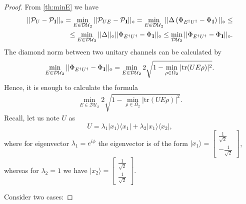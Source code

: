 \documentclass[preprint,12pt, a4paper]{elsarticle}
\newcommand{\ket}[1]{\ensuremath{|#1\rangle}}
\newcommand{\bra}[1]{\ensuremath{\langle#1|}}
\newcommand{\ketbra}[2]{\ensuremath{\ket{#1}\bra{#2}}}
\newcommand{\1}{{\rm 1\hspace{-0.9mm}l}}
\newcommand{\diaguni}{\ensuremath{\mathcal{DU}}}
\newcommand{\tr}{\mathrm{tr}}
\begin{document}
\begin{proof} From \ref{th:minE} we have 
	\begin{equation}
	\begin{split}
	||\mathcal{P}_U - \mathcal{P}_{\1}||_\diamond =\min_{E \in \diaguni_2} 
	||\mathcal{P}_{UE} - \mathcal{P}_{\1}||_\diamond = \min_{E \in 
	\diaguni_2}|| \Delta \left(\Phi_{E^\dagger U^\dagger} - \Phi_{\1} \right) 
	||_\diamond \le \\ \le \min_{E \in \diaguni_2} ||\Delta||_\diamond || 
	\Phi_{E^\dagger U^\dagger} - \Phi_{\1}  ||_\diamond \le \min_{\diaguni_2}|| 
	\Phi_{E^\dagger U^\dagger} - \Phi_{\1} ||_\diamond.
	\end{split}
	\end{equation}
The diamond norm between two unitary channels can be calculated by 
	\begin{equation}
	\min_{E \in \diaguni_2}||\Phi_{E^\dagger U^\dagger} - \Phi_\1||_\diamond  = 
	\min_{E \in \diaguni_2} 2\sqrt{1 - \min_{\rho \in \Omega_2} |\tr(UE \rho 
	)|^2}.
	\end{equation}
Hence,  it is enough to calculate the formula
\begin{equation}
\begin{split}
\min_{E \in \diaguni_2} 2\sqrt{1 - \min_{\rho \in \Omega_2} |\tr(UE \rho )|^2}.
\end{split}
\end{equation}
Recall, let us note $U$ as
\begin{equation}
U= \lambda_1 \ketbra{x_1}{x_1} + \lambda_2 \ketbra{x_1}{x_2}, 
\end{equation}
where  for eigenvector $\lambda_1 = e^{i \phi}$ the eigenvector is of 
the form $\ket{x_1} = 
\left[\begin{array}{c}\frac{1}{\sqrt{2}}\\-\frac{1}{\sqrt{2}}\end{array}\right]$,
 whereas for  $\lambda_2 = 1$ we have $\ket{x_2} = 
\left[\begin{array}{c}\frac{1}{\sqrt{2}}\\\frac{1}{\sqrt{2}}\end{array}\right]$.
 
Consider two cases:


\end{proof}
\end{document}
